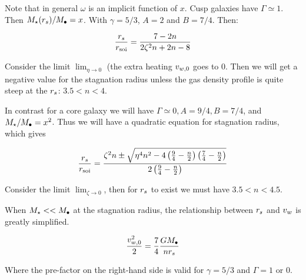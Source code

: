 Note that in general $\omega$ is an implicit function of $x$. Cusp galaxies have $\Gamma\simeq1$.  Then $M_{\star}(r_s)/M_{\bullet}=x$. With $\gamma=5/3$, $A=2$ and $B=7/4$.  Then:

\begin{align}
\frac{r_s}{r_{\rm soi}}=\frac{7-2n}{2\zeta^2 n+2n-8}
\end{align}

Consider the limit $\lim_{\eta \to 0}$ (the extra heating $v_{w,0}$ goes to 0. Then we will get a negative value for the stagnation radius unless the gas density profile is quite steep at the $r_s$: $3.5<n<4$.

In contrast for a core galaxy we will have $\Gamma\simeq0, A=9/4,
B=7/4$, and $M_{\star}/M_{\bullet}=x^2$. Thus we will have a quadratic equation for
stagnation radius, which gives

\begin{align}
\frac{r_s}{r_{\rm soi}}=\frac{\zeta^2 n \pm \sqrt{\eta^4 n^2 -4 \left(\frac{9}{4}-\frac{n}{2}\right) \left(\frac{7}{4}-\frac{n}{2}\right)}}{2\left(\frac{9}{4}-\frac{n}{2}\right)}
\label{eq:rstag}
\end{align}

Consider the limit $\lim_{\zeta \to 0}$, then for $r_s$ to exist we must have $3.5<n<4.5$.

When $M_{\star} << M_{\bullet}$ at the stagnation radius, the relationship between $r_s$ and $v_w$ is greatly simplified. 

\begin{align}
\frac{v_{w,0}^2}{2}=\frac{7}{4}\frac{G M_{\bullet}}{n r_s}
\end{align}

Where the pre-factor on the right-hand side is valid for $\gamma=5/3$ and $\Gamma=1$ or 0.  


